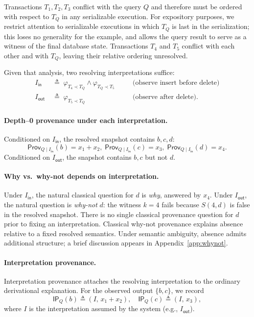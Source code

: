 \documentclass[acmsmall,nonacm]{acmart}
\theoremstyle{remark}
\numberwithin{definition}{section}
\numberwithin{theorem}{section}
\numberwithin{lemma}{section}
\numberwithin{corollary}{section}
\numberwithin{remark}{section}
\numberwithin{example}{section}
\numberwithin{observation}{section}
\numberwithin{assumption}{section}
\newcommand{\Prov}{\mathsf{Prov}}
\begin{document}
Transactions $T_1,T_2,T_3$ conflict with the query $Q$ and therefore must
be ordered with respect to $T_Q$ in any serializable execution. 
For expository purposes, we restrict attention to serializable executions
in which $T_Q$ is last in the serialization; this loses no generality for
the example, and allows the query result to serve as a witness of the final
database state.
Transactions $T_4$ and $T_5$ conflict with each other and with $T_Q$,
leaving their relative ordering unresolved.

Given that analysis, two resolving interpretations suffice:
\[
\begin{aligned}
  I_{\mathsf{in}} &\;\triangleq\; \varphi_{T_4 \prec T_Q} \wedge \varphi_{T_Q \prec T_5} &&\quad\text{(observe insert before delete)}\\
  I_{\mathsf{out}} &\;\triangleq\; \varphi_{T_5 \prec T_Q} &&\quad\text{(observe after delete).}
\end{aligned}
\]

\paragraph{Depth--0 provenance under each interpretation.}
Conditioned on $I_{\mathsf{in}}$, the resolved snapshot contains $b,c,d$:
\[
  \Prov_{Q \mid I_{\mathsf{in}}}(b)=x_1+x_2,\;
  \Prov_{Q \mid I_{\mathsf{in}}}(c)=x_3,\;
  \Prov_{Q \mid I_{\mathsf{in}}}(d)=x_4.
\]
Conditioned on $I_{\mathsf{out}}$, the snapshot contains $b,c$ but not $d$.

\paragraph{Why vs.\ why-not depends on interpretation.}
Under $I_{\mathsf{in}}$, the natural classical question for $d$ is \emph{why},
answered by $x_4$.
Under $I_{\mathsf{out}}$, the natural question is \emph{why-not} $d$: the witness
$k=4$ fails because $S(4,d)$ is false in the resolved snapshot.
There is no single classical provenance question for $d$ prior to fixing an
interpretation. Classical why-not provenance explains absence relative to a fixed resolved
semantics.
Under semantic ambiguity, absence admits additional structure; a brief discussion
appears in Appendix~\ref{app:whynot}.

\paragraph{Interpretation provenance.}
Interpretation provenance attaches the resolving interpretation to the ordinary
derivational explanation.
For the observed output $\{b,c\}$, we record
\[
  \mathsf{IP}_Q(b)\triangleq (I,\, x_1+x_2),\quad
  \mathsf{IP}_Q(c)\triangleq (I,\, x_3),
\]
where $I$ is the interpretation assumed by the system (e.g., $I_{\mathsf{out}}$).
\end{document}
